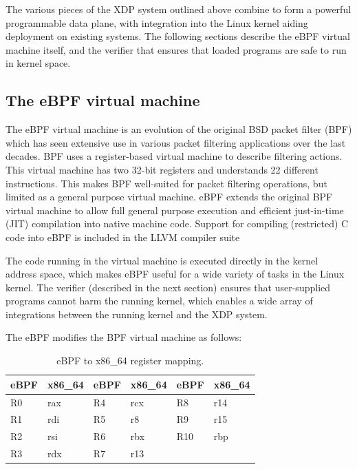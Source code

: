 \documentclass[10pt,sigconf]{acmart}
\begin{document}
The various pieces of the XDP system outlined above combine to form a powerful
programmable data plane, with integration into the Linux kernel aiding
deployment on existing systems. The following sections describe the eBPF virtual
machine itself, and the verifier that ensures that loaded programs are safe to
run in kernel space.

\subsection{The eBPF virtual machine}
\label{sec:bpf-vm}
The eBPF virtual machine is an evolution of the original BSD packet filter (BPF)
\cite{mccanne_bsd_1993} which has seen extensive use in various packet filtering
applications over the last decades. BPF uses a register-based virtual machine to
describe filtering actions. This virtual machine has two 32-bit registers and
understands 22 different instructions. This makes BPF well-suited for packet
filtering operations, but limited as a general purpose virtual machine. eBPF
extends the original BPF virtual machine to allow full general purpose execution
and efficient just-in-time (JIT) compilation into native machine code. Support
for compiling (restricted) C code into eBPF is included in the LLVM compiler
suite

The code running in the virtual machine is executed directly in the kernel
address space, which makes eBPF useful for a wide variety of tasks in the Linux
kernel. The verifier (described in the next section) ensures that user-supplied
programs cannot harm the running kernel, which enables a wide array of
integrations between the running kernel and the XDP system.

The eBPF modifies the BPF virtual machine as follows:

\begin{table}[tbp]
\caption{\label{tbl:reg-map}
eBPF to x86\_64 register mapping.}
\centering
\begin{tabular}{ll|ll|ll}
\toprule
eBPF & x86\_64 & eBPF & x86\_64 & eBPF & x86\_64\\
\midrule
R0 & rax & R4 & rcx & R8 & r14\\
R1 & rdi & R5 & r8 &  R9 & r15\\
R2 & rsi & R6 & rbx & R10 & rbp\\
R3 & rdx & R7 & r13\\
\bottomrule
\end{tabular}
\end{table}
\end{document}
